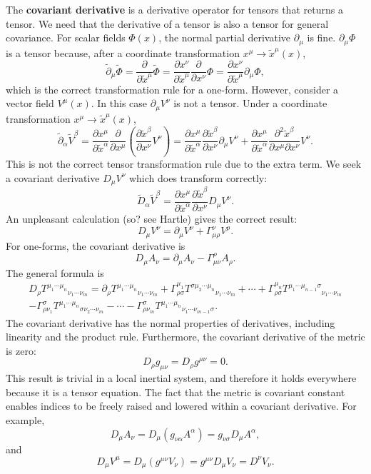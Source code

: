 \documentclass[11pt]{article}
\begin{document}
The \textbf{covariant derivative} is a derivative operator for tensors that returns a tensor.
We need that the derivative of a tensor is also a tensor for general covariance.
For scalar fields $\Phi(x)$, the normal partial derivative $\partial_\mu$ is fine. $\partial_\mu \Phi$ is a tensor because, after a coordinate transformation $x^\mu \rightarrow \tilde{x}^\mu(x)$,
$$ \tilde{\partial}_\mu \tilde{\Phi} = \frac{\partial}{\partial \tilde{x}^\mu} \tilde{\Phi} = \frac{\partial x^\nu}{\partial \tilde{x}^\mu} \frac{\partial}{\partial x^\nu} \Phi = \frac{\partial x^\nu}{\partial \tilde{x}^\mu} \partial_\mu \Phi, $$
which is the correct transformation rule for a one-form.
However, consider a vector field $V^\mu(x)$.
In this case $\partial_\mu V^\nu$ is not a tensor.
Under a coordinate transformation $x^\mu \rightarrow \tilde{x}^\mu(x)$,
$$ \tilde{\partial}_\alpha \tilde{V}^\beta = \frac{\partial x^\mu}{\partial \tilde{x}^\alpha} \frac{\partial}{\partial x^\mu} \left( \frac{\partial \tilde{x}^\beta}{\partial x^\nu} V^\nu \right) = \frac{\partial x^\mu}{\partial \tilde{x}^\alpha} \frac{\partial \tilde{x}^\beta}{\partial x^\nu} \partial_\mu V^\nu + \frac{\partial x^\mu}{\partial \tilde{x}^\alpha} \frac{\partial^2 \tilde{x}^\beta}{\partial x^\mu \partial x^\nu} V^\nu. $$
This is not the correct tensor transformation rule due to the extra term.
We seek a covariant derivative $D_\mu V^\nu$ which does transform correctly:
$$ \tilde{D}_\alpha \tilde{V}^\beta =  \frac{\partial x^\mu}{\partial \tilde{x}^\alpha} \frac{\partial \tilde{x}^\beta}{\partial x^\nu} D_\mu V^\nu. $$
An unpleasant calculation (so? see Hartle) gives the correct result:
$$ D_\mu V^\nu = \partial_\mu V^\nu + \Gamma^\nu_{\mu \rho} V^\rho. $$
For one-forms, the covariant derivative is
$$ D_\mu A_\nu = \partial_\mu A_\nu - \Gamma^\rho_{\mu \nu} A_\rho. $$
The general formula is
\begin{multline*}
D_\rho T^{\mu_1 \cdots \mu_n}{}_{\nu_1 \cdots \nu_m} = \partial_\rho T^{\mu_1 \cdots \mu_n}{}_{\nu_1 \cdots \nu_m} + \Gamma^{\mu_1}_{\rho \sigma} T^{\sigma \mu_2 \cdots \mu_n}{}_{\nu_1 \cdots \nu_m} + \cdots + \Gamma^{\mu_n}_{\rho \sigma} T^{\mu_1 \cdots \mu_{n-1} \sigma}{}_{\nu_1 \cdots \nu_m} \\  - \Gamma^{\sigma}_{\rho \nu_1} T^{\mu_1 \cdots \mu_n}{}_{\sigma \nu_2 \cdots \nu_m} - \cdots - \Gamma^{\sigma}_{\rho \nu_m} T^{\mu_1 \cdots \mu_n}{}_{\nu_1 \cdots \nu_{m-1} \sigma}.
\end{multline*}
The covariant derivative has the normal properties of derivatives, including linearity and the product rule.
Furthermore, the covariant derivative of the metric is zero:
$$ D_\rho g_{\mu \nu} = D_\rho g^{\mu \nu} = 0. $$
This result is trivial in a local inertial system, and therefore it holds everywhere because it is a tensor equation.
The fact that the metric is covariant constant enables indices to be freely raised and lowered within a covariant derivative.
For example,
$$ D_\mu A_\nu = D_\mu (g_{\nu \alpha} A^\alpha) = g_{\nu \sigma} D_\mu A^\alpha, $$
and
$$ D_\mu V^\mu = D_\mu (g^{\mu \nu} V_\nu) = g^{\mu \nu} D_\mu V_\nu = D^\nu V_\nu. $$
\end{document}
